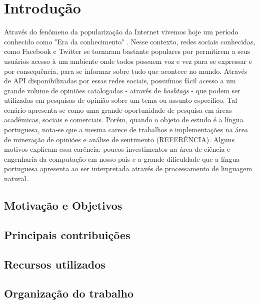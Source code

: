 \chapter{Introdução} \label{cap:1}

Através do fenômeno da popularização da Internet vivemos hoje um período conhecido como "Era da conhecimento" \cite{lastres1999informaccao}.
Nesse contexto, redes sociais conhecidas, como Facebook e Twitter se tornaram bastante populares por permitirem a seus usuários acesso à um ambiente onde todos possuem voz e vez para se expressar e por consequência, para se informar sobre tudo que acontece no mundo.
Através de \ac{API} disponibilizadas por essas redes sociais, possuímos fácil acesso a um grande volume de opiniões catalogadas - através de \textit{hashtags} - que podem ser utilizadas em pesquisas de opinião sobre um tema ou assunto específico. Tal cenário apresenta-se como uma grande oportunidade de pesquisa em áreas acadêmicas, sociais e comerciais.
Porém, quando o objeto de estudo é a língua portuguesa, nota-se que a mesma carece de trabalhos e implementações na área de mineração de opiniões e análise de sentimento (REFERÊNCIA). Alguns motivos explicam essa carência: poucos investimentos na área de ciência e engenharia da computação em nosso país e a grande dificuldade que a língua portuguesa apresenta ao ser interpretada através de processamento de linguagem natural. \cite{santos2000projecto}


\section{Motivação e Objetivos}\label{sec:1_inicio}



\section{Principais contribuições}\label{sec:1_principais_contribuicoes}

\section{Recursos utilizados}\label{sec:1_recursos_utilizados}

\section{Organização do trabalho}\label{sec:1_org}

